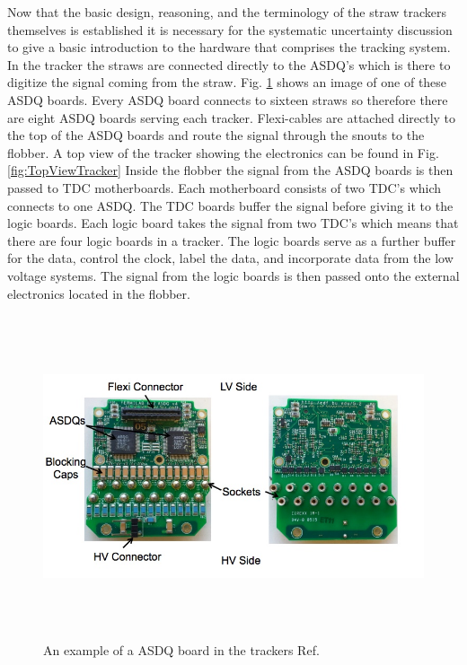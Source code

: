 \documentclass[./Thesis]{subfiles}
\begin{document}
	Now that the basic design, reasoning, and the terminology of the straw trackers themselves is established it is necessary for the systematic uncertainty discussion to give a basic introduction to the hardware that comprises the tracking system.  In the tracker the straws are connected directly to the ASDQ's which is there to digitize the signal coming from the straw.  Fig. \ref{fig:ASDQ} shows an image of one of these ASDQ boards.  Every ASDQ board connects to sixteen straws so therefore there are eight ASDQ boards serving each tracker.   Flexi-cables are attached directly to the top of the ASDQ boards and route the signal through the snouts to the flobber.  A top view of the tracker showing the electronics can be found in Fig. \ref{fig:TopViewTracker} Inside the flobber the signal from the ASDQ boards is then passed to TDC motherboards.  Each motherboard consists of two TDC's which connects to one ASDQ.  The TDC boards buffer the signal before giving it to the logic boards.  Each logic board takes the signal from two TDC's which means that there are four logic boards in a tracker.  The logic boards serve as a further buffer for the data, control the clock, label the data, and incorporate data from the low voltage systems.  The signal from the logic boards is then passed onto the external electronics located in the flobber.
	
\begin{figure}
	\centerline{\includegraphics[height=95mm]{ASDQ.jpeg}}
	\caption[Straw Tracker ASDQ]{ An example of a ASDQ board in the trackers Ref. \cite{jmottASDQ}
	}
	\label{fig:ASDQ}
\end{figure} 
	
\end{document}

